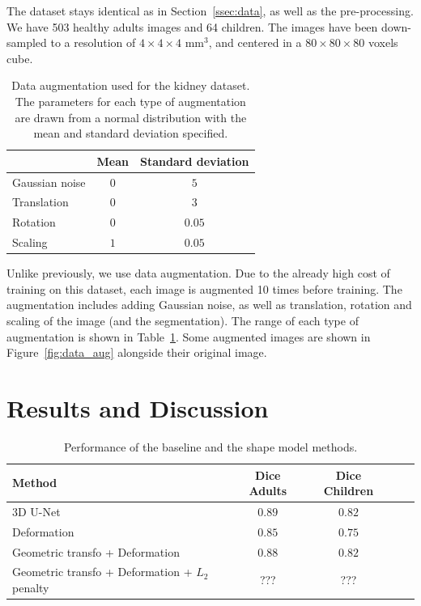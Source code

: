 The dataset stays identical as in Section~\ref{ssec:data}, as well as the pre-processing. We have 503 healthy adults images and 64 children. The images have been down-sampled to a resolution of $4 \times 4 \times 4$ mm$^3$, and centered in a $80 \times 80 \times 80$ voxels cube. 

\begin{table}[htb]
	\centering
	\begin{tabular}{|l|c|c|}
	    \hline
                        & Mean & Standard deviation \\
        \hline
         Gaussian noise & $0$ & $5$ \\
         Translation & $0$ & $3$ \\
         Rotation & $0$ & $0.05$ \\
         Scaling & $1$ & $0.05$ \\
        \hline
    \end{tabular}
	\caption{Data augmentation used for the kidney dataset. The parameters for each type of augmentation are drawn from a normal distribution with the mean and standard deviation specified.}
	\label{table:data_aug}
\end{table}

Unlike previously, we use data augmentation. Due to the already high cost of training on this dataset, each image is augmented 10 times before training. The augmentation includes adding Gaussian noise, as well as translation, rotation and scaling of the image (and the segmentation). The range of each type of augmentation is shown in Table~\ref{table:data_aug}. Some augmented images are shown in Figure~\ref{fig:data_aug} alongside their original image.

\section{Results and Discussion}
\label{sec:seg_result}

\begin{table}[htbp]
	\centering
\begin{tabular}{|l|c|c|c|c|}
	\hline
    Method & Dice Adults & Dice Children \\
	\hline
    3D U-Net & $\bm{0.89}$ & $\bm{0.82}$ \\
    Deformation & $0.85$ & $0.75$ \\
    Geometric transfo + Deformation & $0.88$ & $\bm{0.82}$ \\
    Geometric transfo + Deformation + $L_2$ penalty & ??? & ??? \\
    \hline
\end{tabular}
	\vspace{2mm}
	\caption{Performance of the baseline and the shape model methods.}
    \label{table:seg_results}
\end{table}

